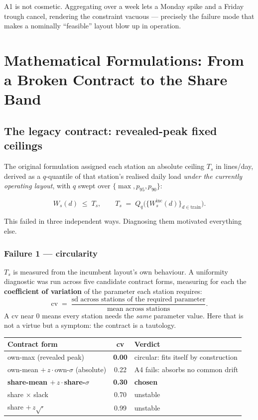 \documentclass[11pt,a4paper]{article}
\begin{document}
A1 is not cosmetic. Aggregating over a week lets a Monday spike and a Friday
trough cancel, rendering the constraint vacuous --- precisely the failure mode
that makes a nominally ``feasible'' layout blow up in operation.

\section{Mathematical Formulations: From a Broken Contract to the Share Band}

\subsection{The legacy contract: revealed-peak fixed ceilings}

The original formulation assigned each station an absolute ceiling $T_s$ in
lines/day, derived as a $q$-quantile of that station's realised daily load
\emph{under the currently operating layout}, with $q$ swept over
$\{\max, p_{95}, p_{90}\}$:

\begin{equation}
  W_s(d) \;\le\; T_s,
  \qquad
  T_s \;=\; Q_q\bigl(\{W_s^{\mathrm{inc}}(d)\}_{d\in\mathrm{train}}\bigr).
  \label{eq:legacy}
\end{equation}

This failed in three independent ways. Diagnosing them motivated everything else.

\subsubsection*{Failure 1 --- circularity}

$T_s$ is measured from the incumbent layout's own behaviour. A uniformity
diagnostic was run across five candidate contract forms, measuring for each the
\textbf{coefficient of variation} of the parameter each station requires:
\[
  \mathrm{cv} \;=\;
  \frac{\text{sd across stations of the required parameter}}
       {\text{mean across stations}} .
\]
A cv near $0$ means every station needs the \emph{same} parameter value. Here
that is not a virtue but a symptom: the contract is a tautology.

\begin{center}
\begin{tabular}{lcl}
\toprule
Contract form & cv & Verdict \\
\midrule
own-max (revealed peak)                 & \textbf{0.00} & circular: fits itself by construction \\
own-mean $+\,z\cdot$own-$\sigma$ (absolute) & 0.22 & A4 fails: absorbs no common drift \\
\textbf{share-mean $+\,z\cdot$share-$\sigma$} & \textbf{0.30} & \textbf{chosen} \\
share $\times$ slack                    & 0.70 & unstable \\
share $+\,z\sqrt{\cdot}$                & 0.99 & unstable \\
\bottomrule
\end{tabular}
\end{center}
\end{document}
